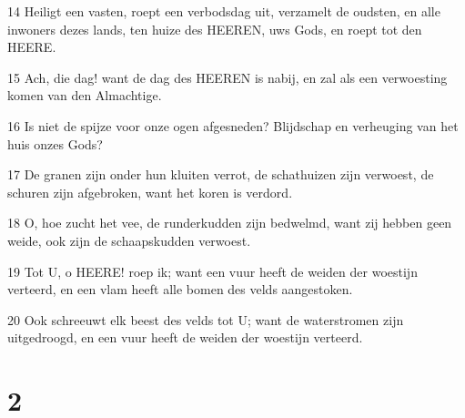 \par 14 Heiligt een vasten, roept een verbodsdag uit, verzamelt de oudsten, en alle inwoners dezes lands, ten huize des HEEREN, uws Gods, en roept tot den HEERE.
\par 15 Ach, die dag! want de dag des HEEREN is nabij, en zal als een verwoesting komen van den Almachtige.
\par 16 Is niet de spijze voor onze ogen afgesneden? Blijdschap en verheuging van het huis onzes Gods?
\par 17 De granen zijn onder hun kluiten verrot, de schathuizen zijn verwoest, de schuren zijn afgebroken, want het koren is verdord.
\par 18 O, hoe zucht het vee, de runderkudden zijn bedwelmd, want zij hebben geen weide, ook zijn de schaapskudden verwoest.
\par 19 Tot U, o HEERE! roep ik; want een vuur heeft de weiden der woestijn verteerd, en een vlam heeft alle bomen des velds aangestoken.
\par 20 Ook schreeuwt elk beest des velds tot U; want de waterstromen zijn uitgedroogd, en een vuur heeft de weiden der woestijn verteerd.

\chapter{2}

